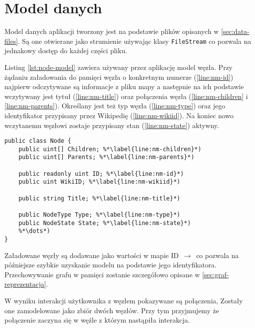 \section{Model danych}
Model danych aplikacji tworzony jest na podstawie plików opisanych w \ref{sec:data-files}. Są one otwierane jako strumienie używając klasy \lstinline[basicstyle=\normalsize]{FileStream} co pozwala na jednakowy dostęp do każdej części pliku. 

Listing \ref{lst:node-model} zawiera używany przez aplikację model węzła. Przy żądaniu załadowania do pamięci węzła o konkretnym numerze (\ref{line:nm-id}) najpierw odczytywane są informacje z pliku mapy a następnie na ich podstawie wczytywany jest tytuł (\ref{line:nm-title}) oraz połączenia węzła (\ref{line:nm-children} i \ref{line:nm-parents}). Określany jest też typ węzła (\ref{line:nm-type}) oraz jego identyfikator przypisany przez Wikipedię (\ref{line:nm-wikiid}). Na koniec nowo wczytanemu węzłowi zostaje przypisany stan (\ref{line:nm-state}) aktywny.
\begin{lstlisting}[caption={Model węzła grafu}, label=lst:node-model]
public class Node {
	public uint[] Children; %*\label{line:nm-children}*)
	public uint[] Parents; %*\label{line:nm-parents}*)

	public readonly uint ID; %*\label{line:nm-id}*)
	public uint WikiID; %*\label{line:nm-wikiid}*)

	public string Title; %*\label{line:nm-title}*)

	public NodeType Type; %*\label{line:nm-type}*)
	public NodeState State; %*\label{line:nm-state}*)
	%*\dots*)
}
\end{lstlisting}

Załadowane węzły są dodawane jako wartości w mapie ID $\,\to\,$  co pozwala na późniejsze szybkie uzyskanie modelu na podstawie jego identyfikatora. Przechowywanie grafu w pamięci zostanie szczegółowo opisane w \ref{sec:graf-reprezentacja}.

W wyniku interakcji użytkownika z węzłem pokazywane są połączenia, Zostały one zamodelowane jako zbiór dwóch węzłów. Przy tym przyjmujemy że połączenie zaczyna się w węźle z którym nastąpiła interakcja.
